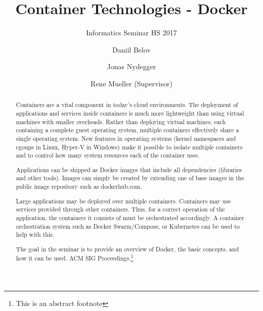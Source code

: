 \documentclass[sigconf]{acmart}
\begin{document}
\title{Container Technologies - Docker}
\subtitle{Informatics Seminar HS 2017}

\author{Daniil Belov}

\author{Jonas Nydegger}

\author{Rene Mueller (Supervisor)}

\begin{abstract}
Containers are a vital component in today’s cloud environments. The deployment of applications and services inside containers is much more lightweight than using virtual machines with smaller overheads. Rather than deploying virtual machines, each containing a complete guest operating system, multiple containers effectively share a single operating system. New features in operating systems (kernel namespaces and cgoups in Linux, Hyper-V in Windows) make it possible to isolate multiple containers and to control how many system resources each of the container uses.

Applications can be shipped as Docker images that include all dependencies (libraries and other tools). Images can simply be created by extending one of base images in the public image repository such as dockerhub.com.

Large applications may be deployed over multiple containers. Containers may use services provided through other containers. Thus, for a correct operation of the application, the containers it consists of must be orchestrated accordingly. A container orchestration system such as Docker Swarm/Compose, or Kubernetes can be used to help with this.

The goal in the seminar is to provide an overview of Docker, the basic concepts, and how it can be used.
ACM SIG Proceedings.\footnote{This is an abstract footnote}
\end{abstract}
\end{document}
